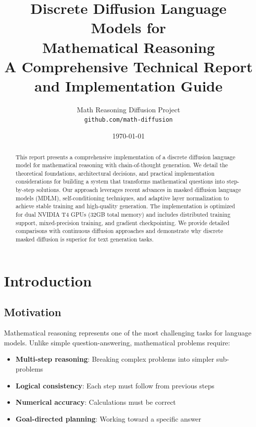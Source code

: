 \documentclass[11pt,a4paper]{article}
\title{
    \vspace{-2cm}
    \textbf{Discrete Diffusion Language Models for\\Mathematical Reasoning}\\[0.5cm]
    \large A Comprehensive Technical Report and Implementation Guide
}
\author{
    Math Reasoning Diffusion Project\\
    \texttt{github.com/math-diffusion}
}
\date{\today}
\begin{document}
\maketitle

\begin{abstract}
This report presents a comprehensive implementation of a discrete diffusion language model for mathematical reasoning with chain-of-thought generation. We detail the theoretical foundations, architectural decisions, and practical implementation considerations for building a system that transforms mathematical questions into step-by-step solutions. Our approach leverages recent advances in masked diffusion language models (MDLM), self-conditioning techniques, and adaptive layer normalization to achieve stable training and high-quality generation. The implementation is optimized for dual NVIDIA T4 GPUs (32GB total memory) and includes distributed training support, mixed-precision training, and gradient checkpointing. We provide detailed comparisons with continuous diffusion approaches and demonstrate why discrete masked diffusion is superior for text generation tasks.
\end{abstract}

\tableofcontents
\newpage

\section{Introduction}

\subsection{Motivation}

Mathematical reasoning represents one of the most challenging tasks for language models. Unlike simple question-answering, mathematical problems require:

\begin{itemize}
    \item \textbf{Multi-step reasoning}: Breaking complex problems into simpler sub-problems
    \item \textbf{Logical consistency}: Each step must follow from previous steps
    \item \textbf{Numerical accuracy}: Calculations must be correct
    \item \textbf{Goal-directed planning}: Working toward a specific answer
\end{itemize}
\end{document}
